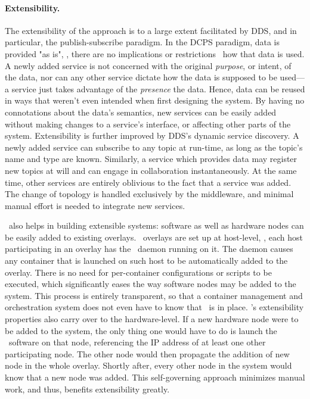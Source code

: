 \paragraph{Extensibility.}
The extensibility of the approach is to a large extent facilitated by DDS, and in particular, the publish-subscribe paradigm. In the DCPS paradigm, data is provided "as is", \ie , there are no implications or restrictions \wrt\ how that data is used. A newly added service is not concerned with the original \emph{purpose}, or intent, of the data, nor can any other service dictate how the data is supposed to be used---a service just takes advantage of the \emph{presence} the data. Hence, data can be reused in ways that weren't even intended when first designing the system. By having no connotations about the data's semantics, new services can be easily added without making changes to a service's interface, or affecting other parts of the system. Extensibility is further improved by DDS's dynamic service discovery. A newly added service can subscribe to any topic at run-time, as long as the topic's name and type are known. Similarly, a service which provides data may register new topics at will and can engage in collaboration instantaneously. At the same time, other services are entirely oblivious to the fact that a service was added. The change of topology is handled exclusively by the middleware, and minimal manual effort is needed to integrate new services.

\wnet\ also helps in building extensible systems: software as well as hardware nodes can be easily added to existing overlays. \weave\ overlays are set up at host-level, \ie , each host participating in an overlay has the \weave\ daemon running on it. The daemon causes any container that is launched on such host to be automatically added to the overlay. There is no need for per-container configurations or scripts to be executed, which significantly eases the way software nodes may be added to the system. This process is entirely transparent, so that a container management and orchestration system does not even have to know that \weave\ is in place. \weave 's extensibility properties also carry over to the hardware-level. If a new hardware node were to be added to the system, the only thing one would have to do is launch the \weave\ software on that node, referencing the IP address of at least one other participating node. The other node would then propagate the addition of new node in the whole overlay. Shortly after, every other node in the system would know that a new node was added. This self-governing approach minimizes manual work, and thus, benefits extensibility greatly.

